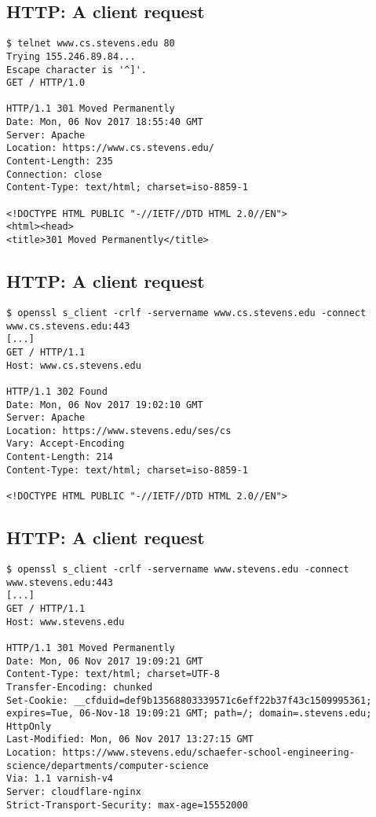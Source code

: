 \documentclass[xga]{xdvislides}
\begin{document}
\subsection{HTTP: A client request}
\smallish
\begin{verbatim}
$ telnet www.cs.stevens.edu 80
Trying 155.246.89.84...
Escape character is '^]'.
GET / HTTP/1.0

HTTP/1.1 301 Moved Permanently
Date: Mon, 06 Nov 2017 18:55:40 GMT
Server: Apache
Location: https://www.cs.stevens.edu/
Content-Length: 235
Connection: close
Content-Type: text/html; charset=iso-8859-1

<!DOCTYPE HTML PUBLIC "-//IETF//DTD HTML 2.0//EN">
<html><head>
<title>301 Moved Permanently</title>
\end{verbatim}
\Normalsize

\subsection{HTTP: A client request}
\smallish
\begin{verbatim}
$ openssl s_client -crlf -servername www.cs.stevens.edu -connect www.cs.stevens.edu:443
[...]
GET / HTTP/1.1
Host: www.cs.stevens.edu

HTTP/1.1 302 Found
Date: Mon, 06 Nov 2017 19:02:10 GMT
Server: Apache
Location: https://www.stevens.edu/ses/cs
Vary: Accept-Encoding
Content-Length: 214
Content-Type: text/html; charset=iso-8859-1

<!DOCTYPE HTML PUBLIC "-//IETF//DTD HTML 2.0//EN">
\end{verbatim}
\Normalsize

\subsection{HTTP: A client request}
\smallish
\begin{verbatim}
$ openssl s_client -crlf -servername www.stevens.edu -connect www.stevens.edu:443
[...]
GET / HTTP/1.1
Host: www.stevens.edu

HTTP/1.1 301 Moved Permanently
Date: Mon, 06 Nov 2017 19:09:21 GMT
Content-Type: text/html; charset=UTF-8
Transfer-Encoding: chunked
Set-Cookie: __cfduid=def9b13568803339571c6eff22b37f43c1509995361;
expires=Tue, 06-Nov-18 19:09:21 GMT; path=/; domain=.stevens.edu; HttpOnly
Last-Modified: Mon, 06 Nov 2017 13:27:15 GMT
Location: https://www.stevens.edu/schaefer-school-engineering-science/departments/computer-science
Via: 1.1 varnish-v4
Server: cloudflare-nginx
Strict-Transport-Security: max-age=15552000
\end{verbatim}
\Normalsize
\end{document}
